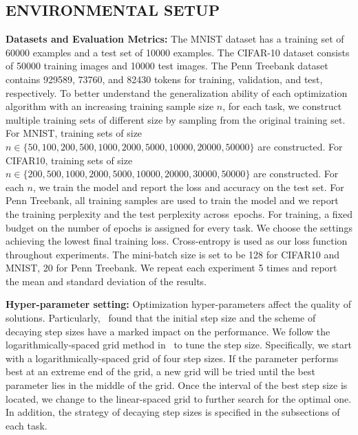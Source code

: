 \documentclass[11pt]{article}
\begin{document}
\vspace{-0.05in}
\subsection{ENVIRONMENTAL SETUP}

\textbf{Datasets and Evaluation Metrics:}  The MNIST dataset has a training set of 60000 examples and a test set of 10000 examples. The CIFAR-10 dataset consists of 50000 
training images and 10000 test images. The Penn Treebank dataset contains 929589, 73760, and 82430 tokens for training, validation, and test,  respectively.
To better understand the generalization ability of each optimization algorithm with an increasing training sample size $n$, for each task, we construct multiple training sets of different size by sampling from the original training set. For MNIST, training sets of size $n \in \{50, 100, 200, 500, 1000, 2000, 5000, 10000, 20000, 50000 \}$ are constructed. For CIFAR10, training sets of size $n \in \{ 200, 500, 1000, 2000, 5000, 10000, 20000, 30000, 50000\}$ are constructed. 
For each $n$, we train the model and report the loss and accuracy on the test set.  For Penn Treebank, all training samples are used to 
train the model and we
report the training perplexity and the test perplexity across~epochs. For training, a fixed budget on the number of epochs is assigned for every task. We choose the settings achieving the lowest final training loss.  Cross-entropy is used as our loss function throughout experiments. The mini-batch size is set to be 128 for CIFAR10 and MNIST, 20 for Penn Treebank. 
We repeat each experiment 5 times and report the mean and standard deviation of the results.

\vspace{0.05in}
\textbf{Hyper-parameter setting:} Optimization hyper-parameters affect the quality of solutions. Particularly,~\citet{wiro17} found that the initial step size and the scheme of decaying step sizes have a marked impact on the performance. We follow the logarithmically-spaced grid method in~\citet{wiro17} to tune the step size. Specifically, we start with a logarithmically-spaced grid of four step sizes. If the parameter performs best at an extreme end of the grid, a new grid will be tried until the best parameter lies in the middle of the grid. Once the interval of the best step size is located, we change to the linear-spaced grid to further search for the optimal one. %
In addition, the strategy of decaying step sizes is specified in the subsections of each task. 
\end{document}
